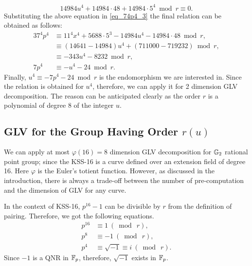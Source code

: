 \begin{equation}
14984u^4+14984 \cdot 48+ 14984 \cdot 5^4 \bmod r \equiv 0.
\end{equation}
Substituting the above equation in \eqref{eq_74p4_3} the final relation can be obtained as follows:
\begin{alignat}{3}
7^4p^4  & \equiv 11^4x^4 + 5688 \cdot 5^3 - 14984 u^{4} - 14984 \cdot 48 \bmod r, \nonumber \\
&\equiv  (14641-14984)u^4 + (711000-719232) \bmod r, \nonumber \\
& \equiv  -343 u^4 -8232 \bmod r, \nonumber \\
7p^4 & \equiv  -u^4 -24 \bmod r.  \label{eq_p_u_relation}
\end{alignat}
Finally, $u^4 \equiv -7p^4-24 \bmod r$ is the endomorphism we are interested in.
Since the relation is obtained for $u^4$, therefore, we can apply it for 2 dimension GLV decomposition.
The reason can be anticipated clearly as the order $r$ is a polynomial of degree 8 of the integer $u$.

\subsection{GLV for the Group Having Order \texorpdfstring{$r(u)$}{}}
We can apply at most $\varphi(16)= 8$ dimension GLV decomposition for ${\mathbb{G}}_{2}$ rational point group; since the KSS-16 is a curve defined over an extension field of degree 16.
Here $\varphi$ is the Euler's totient function.
However, as discussed in the introduction, there is always a trade-off between the number of pre-computation and the dimension of GLV for any curve. 

In the context of KSS-16, $p^{16}-1$ can be divisible by $r$ from the definition of pairing.  Therefore, we got the following equations.
\begin{subequations}
	\begin{alignat}{3}
	p^{16} &\equiv 1~(\bmod~r), \\
	\label{p8_m1}
	p^{8}&\equiv -1~(\bmod~r),\\
	\label{p4_i}
	p^{4} &\equiv \sqrt{-1} \equiv i~(\bmod~r).
	\end{alignat}
\end{subequations}
Since $-1$ is a QNR in $\mathbb{F}_p$, therefore, $\sqrt{-1}$ exists in ${\mathbb{F}}_{p}$. 

